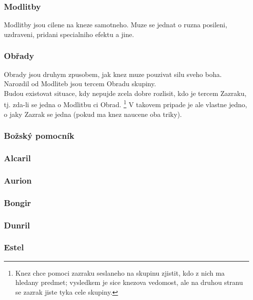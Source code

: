 \subsubsection*{Modlitby}
\label{sec:modlitby}
Modlitby jsou  cilene na kneze samotneho. Muze se jednat o ruzna posileni, uzdraveni, pridani specialniho efektu a jine. 

\subsubsection*{Obřady}
\label{sec:obrady}
Obrady jsou druhym zpusobem, jak knez muze pouzivat silu sveho boha. Narozdil od Modliteb jsou tercem Obradu skupiny.\\

Budou existovat situace, kdy nepujde zcela dobre rozlisit, kdo je tercem Zazraku, tj. zda-li se jedna o Modlitbu ci Obrad. \footnote{Knez chce pomoci zazraku seslaneho na skupinu zjistit, kdo z nich ma hledany predmet; vysledkem je sice knezova vedomost, ale na druhou stranu se zazrak jiste tyka cele skupiny.} V takovem pripade je ale vlastne jedno, o jaky Zazrak se jedna (pokud ma knez naucene oba triky).

\subsubsection*{Božský pomocník}
\label{sec:bozsky-pomocnik}

\subsubsection{Alcaril}
\label{sec:alcaril}

\subsubsection{Aurion}
\label{sec:aurion}

\subsubsection{Bongir}
\label{sec:bongir}

\subsubsection{Dunril}
\label{sec:dunril}

\subsubsection{Estel}
\label{sec:estel}

